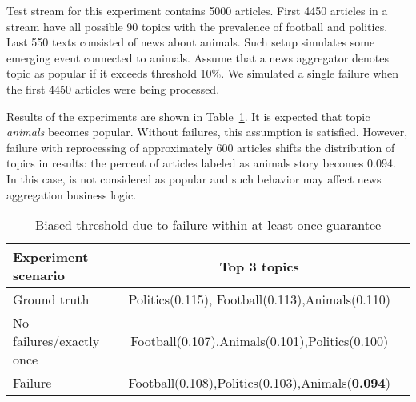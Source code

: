 
Test stream for this experiment contains 5000 articles. First 4450 articles in a stream have all possible 90 topics with the prevalence of football and politics. Last 550 texts consisted of news about animals. Such setup simulates some emerging event connected to animals. Assume that a news aggregator denotes topic as popular if it exceeds threshold 10\%. We simulated a single failure when the first 4450 articles were being processed.

Results of the experiments are shown in Table~\ref{biased_threshold}. It is expected that topic {\em animals} becomes popular. Without failures, this assumption is satisfied. However, failure with reprocessing of approximately 600 articles shifts the distribution of topics in results: the percent of articles labeled as animals story becomes 0.094. In this case, is not considered as popular and such behavior may affect news aggregation business logic.

\begin{table}[htbp]
\caption{Biased threshold due to failure within at least once guarantee}
\begin{threeparttable}
\begin{tabular}{lcl}
Experiment scenario    & Top 3 topics    \\
\hline
Ground truth   &   Politics(0.115), Football(0.113),Animals(0.110)    \\
No failures/exactly once   &   Football(0.107),Animals(0.101),Politics(0.100)    \\
Failure   &   Football(0.108),Politics(0.103),Animals({\bf 0.094})    \\
\end{tabular}
\end{threeparttable}
\label{biased_threshold}
\end{table}

